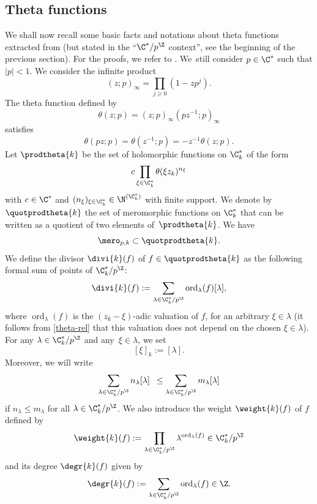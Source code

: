 \subsection{Theta functions}\label{sec32}
We shall now recall some basic facts and notations about theta functions extracted from \cite[\S 3]{dreyfus2015galois} (but stated in the ``$\C^{*}/p ^{\Z}$ context'', see the beginning of the previous section). For the proofs, we refer to \cite[Chap.\,I]{Mumford}.
We~still consider $p\in \C^{*}$ such that $\vert p \vert < 1$. We consider the infinite product
\[
(z;p)_{\infty}= \prod_{j\geq 0}(1-zp^{j}).
\]
The theta function defined by
\begin{equation}\label{theta-def}\theta (z;p)=(z;p)_{\infty}(pz^{-1};p)_{\infty}\end{equation}
satisfies
\begin{equation}\label{theta-rel} \theta (pz;p)= \theta (z^{-1};p)=-z^{-1}\theta (z;p).\end{equation}
Let $\prodtheta{k}$ be the set of holomorphic functions on $\C^{*}_k$ of the form
\[
c \prod_{\xi \in \C^{*}_{k}} \theta(\xi z_k)^{n_{\xi}}
\]
with $c \in \C^{*}$ and $(n_{\xi})_{\xi \in \C^{*}_{k}}\in \N^{(\C^{*}_{k})}$
with finite support.
We denote by $\quotprodtheta{k}$ the set of meromorphic functions on $\C^{*}_{k}$ that can be written as a quotient of two elements of~$\prodtheta{k}$. We have
\[
\mero_{p,k}\subset \quotprodtheta{k}.
\]
We define the divisor $\divi{k} (f)$ of
$
f \in \quotprodtheta{k}
$
as the following formal sum of points of $\C^{*}_{k}/p^{\Z}$:
\[
\divi{k} (f):= \sum_{\lambda \in \C^{*}_{k}/p^{\Z}} \operatorname{ord}_{\lambda}(f)[\lambda],
\]
where $\operatorname{ord}_{\lambda}(f)$ is the $(z_k-\xi)$-adic valuation of $f$, for an arbitrary $\xi \in \lambda$ (it follows from \eqref{theta-rel} that this valuation does not depend on the chosen $\xi \in \lambda$).
For any $\lambda \in \C^{*}_{k}/p^{\Z}$ and any~$\xi \in \lambda$, we set
\[
[\xi]_k:=[\lambda].
\]
Moreover, we will write
\[
\sum_{\lambda \in \C^{*}_{k}/p^{\Z}} n_{\lambda} [\lambda] \,\,\,\leq \sum_{\lambda \in \C^{*}_{k}/p^{\Z}} m_{\lambda} [\lambda]
\]
if $n_{\lambda} \leq m_{\lambda}$ for all $\lambda \in \C^{*}_{k}/p^{\Z}$.
We also introduce the weight $\weight{k} (f)$ of $f$ defined by
\[
\weight{k}(f):=\prod_{\lambda \in \C^{*}_{k}/p^{\Z}} \lambda^{\operatorname{ord}_{\lambda}(f)} \in \C^{*}_{k}/p^{\Z}
\]
and its degree $\degr{k} (f)$ given by
\[
\degr{k} (f):=\sum_{\lambda \in \C^{*}_{k}/p^{\Z}} \operatorname{ord}_{\lambda}(f) \in \Z.
\]

